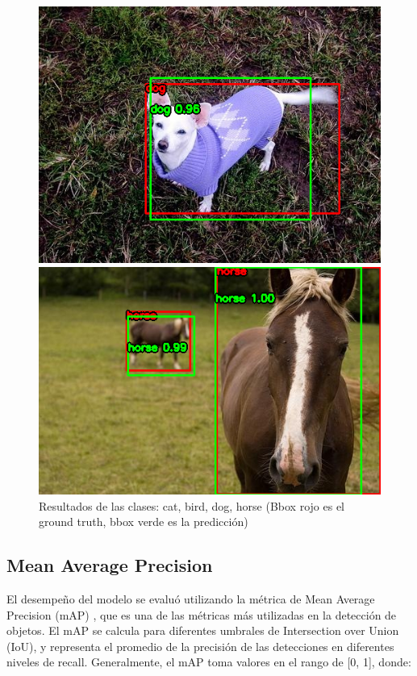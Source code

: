 \documentclass{article}
\begin{document}
\begin{figure}[htbp]
\begin{minipage}{0.24\textwidth}
      \includegraphics[width=\linewidth]{results_lg/dog_44.png}
  \end{minipage}
  \begin{minipage}{0.24\textwidth}
      \centering
      \includegraphics[width=\linewidth]{results_lg/horse_42.png}
  \end{minipage}
  
  \caption{Resultados de las clases: cat, bird, dog, horse (Bbox rojo es el ground truth, bbox verde es la predicción)}
  \label{fig:results}
\end{figure}

\subsection{Mean Average Precision}
El desempeño del modelo se evaluó utilizando la métrica de Mean Average Precision (mAP) \cite{henderson2017endtoendtrainingobjectclass}, que es una de las métricas más utilizadas en la detección de objetos. 
El mAP se calcula para diferentes umbrales de Intersection over Union (IoU), y representa el promedio de la precisión de las detecciones en diferentes niveles de recall.
Generalmente, el mAP toma valores en el rango de [0, 1], donde:
\end{document}
